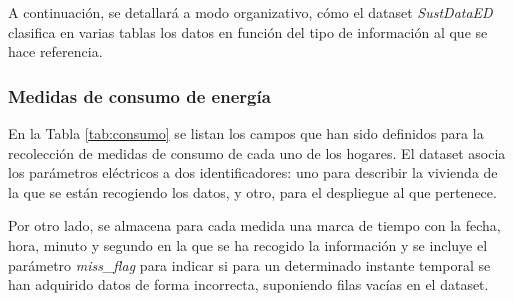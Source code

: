 \vspace{3mm}

A continuación, se detallará a modo organizativo, cómo el dataset \textit{SustDataED} clasifica en varias tablas los datos en función del tipo de información al que se hace referencia.

\subsubsection{Medidas de consumo de energía}

En la Tabla \ref{tab:consumo} se listan los campos que han sido definidos para la recolección de medidas de consumo de cada uno de los hogares. El dataset asocia los parámetros eléctricos a dos identificadores: uno para describir la vivienda de la que se están recogiendo los datos, y otro, para el despliegue al que pertenece. 

\vspace{3mm}

Por otro lado, se almacena para cada medida una marca de tiempo con la fecha, hora, minuto y segundo en la que se ha recogido la información y se incluye el parámetro \textit{miss\_flag} para indicar si para un determinado instante temporal se han adquirido datos de forma incorrecta, suponiendo filas vacías en el dataset.

\vspace{3mm}

